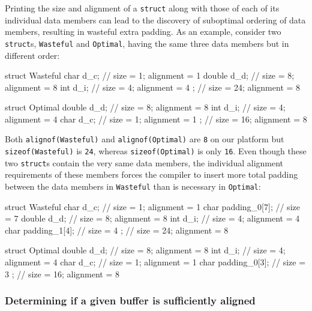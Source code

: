 \noindent Printing the size and alignment of a \lstinline!struct! along with those of
each of its individual data members can lead to the discovery of
suboptimal ordering of data members, resulting in wasteful extra
padding. As an example, consider two \lstinline!struct!s,
\lstinline!Wasteful! and \lstinline!Optimal!, having the same three data members but
in different order:

\begin{emcppslisting}
struct Wasteful
{
    char   d_c;  // size =  1;  alignment = 1
    double d_d;  // size =  8;  alignment = 8
    int    d_i;  // size =  4;  alignment = 4
};               // size = 24;  alignment = 8

struct Optimal
{
    double d_d;  // size =  8;  alignment = 8
    int    d_i;  // size =  4;  alignment = 4
    char   d_c;  // size =  1;  alignment = 1
};               // size = 16;  alignment = 8
\end{emcppslisting}
    
\noindent Both \lstinline!alignof(Wasteful)! and \lstinline!alignof(Optimal)! are
\lstinline!8! on our platform but \lstinline!sizeof(Wasteful)! is \lstinline!24!, whereas
\lstinline!sizeof(Optimal)! is only \lstinline!16!. Even though these two
\lstinline!struct!s contain the very same data members, the individual
alignment requirements of these members forces the compiler to insert
more total padding between the data members in \lstinline!Wasteful! than is
necessary in \lstinline!Optimal!:

\begin{emcppslisting}
struct Wasteful
{
    char   d_c;           // size =  1;  alignment = 1
    char   padding_0[7];  // size =  7
    double d_d;           // size =  8;  alignment = 8
    int    d_i;           // size =  4;  alignment = 4
    char   padding_1[4];  // size =  4
};                        // size = 24;  alignment = 8

struct Optimal
{
    double d_d;           // size =  8;  alignment = 8
    int    d_i;           // size =  4;  alignment = 4
    char   d_c;           // size =  1;  alignment = 1
    char   padding_0[3];  // size =  3
};                        // size = 16;  alignment = 8
\end{emcppslisting}
    

\subsubsection[Determining if a given buffer is sufficiently aligned]{Determining if a given buffer is sufficiently aligned}\label{determining-if-a-given-buffer-is-sufficiently-aligned}

